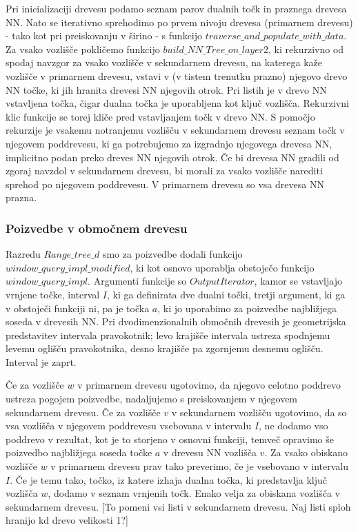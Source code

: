 \documentclass[a4paper, 12pt]{book}
\begin{document}
Pri inicializaciji drevesu podamo seznam parov dualnih točk in praznega drevesa NN. Nato se iterativno sprehodimo po prvem nivoju drevesa (primarnem drevesu) - tako kot pri preiskovanju v širino - s funkcijo $traverse\texttt{\_}and\texttt{\_}populate\texttt{\_}with\texttt{\_}data$. Za vsako vozlišče pokličemo funkcijo $build\texttt{\_}NN\texttt{\_}Tree\texttt{\_}on\texttt{\_}layer2$, ki rekurzivno  od spodaj navzgor za vsako vozlišče v sekundarnem drevesu, na katerega kaže vozlišče v primarnem drevesu, vstavi v (v tistem trenutku prazno) njegovo drevo NN točke, ki jih hranita drevesi NN njegovih otrok. Pri listih je v drevo NN vstavljena točka, čigar dualna točka je uporabljena kot ključ vozlišča. Rekurzivni klic funkcije se torej kliče pred vstavljanjem točk v drevo NN. S pomočjo rekurzije je vsakemu notranjemu vozlišču v sekundarnem drevesu seznam točk v njegovem poddrevesu, ki ga potrebujemo za izgradnjo njegovega drevesa NN, implicitno podan preko dreves NN njegovih otrok. Če bi drevesa NN gradili od zgoraj navzdol v sekundarnem drevesu, bi morali za vsako vozlišče narediti sprehod po njegovem poddrevesu. V primarnem drevesu so vsa drevesa NN prazna.

\subsubsection{Poizvedbe v območnem drevesu}
Razredu $Range\texttt{\_}tree\texttt{\_}d$ smo za poizvedbe dodali funkcijo $window\texttt{\_}query\texttt{\_}impl\texttt{\_}modified$, ki  kot osnovo uporablja obstoječo funkcijo $window\texttt{\_}query\texttt{\_}impl$. Argumenti funkcije so $OutputIterator$, kamor se vstavljajo vrnjene točke, interval $I$, ki ga definirata dve dualni točki, tretji argument, ki ga v obstoječi funkciji ni, pa je točka $a$, ki jo uporabimo za poizvedbe najbližjega soseda v drevesih NN. Pri dvodimenzionalnih območnih drevesih je geometrijska predstavitev intervala pravokotnik; levo krajišče intervala ustreza spodnjemu levemu oglišču pravokotnika, desno krajišče pa zgornjemu desnemu oglišču. Interval je zaprt. 

Če za vozlišče $w$ v primarnem drevesu ugotovimo, da njegovo celotno poddrevo ustreza pogojem poizvedbe, nadaljujemo s preiskovanjem v njegovem sekundarnem drevesu. Če za vozlišče $v$ v sekundarnem vozlišču ugotovimo, da so vsa vozlišča v njegovem poddrevesu vsebovana v intervalu $I$, ne dodamo vso poddrevo v rezultat, kot je to storjeno v osnovni funkciji, temveč opravimo še poizvedbo najbližjega soseda točke $a$ v drevesu NN vozlišča $v$. Za vsako obiskano vozlišče $w$ v primarnem drevesu prav tako preverimo, če je vsebovano v intervalu $I$. Če je temu tako, točko, iz katere izhaja dualna točka, ki predstavlja ključ vozlišča $w$, dodamo v seznam vrnjenih točk. Enako velja za obiskana vozlišča v sekundarnem drevesu. [To pomeni vsi listi v sekundarnem drevesu. Naj listi sploh hranijo kd drevo velikosti 1?] 
\end{document}
